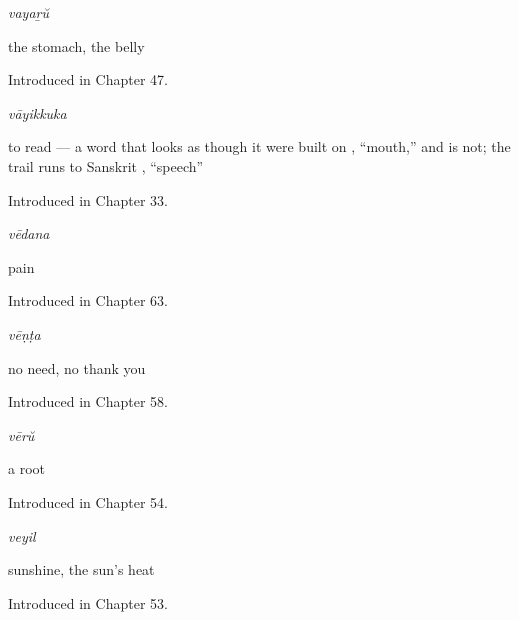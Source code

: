 \noindent\begin{minipage}[t]{\linewidth}
\raggedright
\textbf{}\enspace\emph{vayaṟŭ}\par
\small the stomach, the belly\par
\footnotesize Introduced in Chapter 47.
\end{minipage}\par\medskip

\noindent\begin{minipage}[t]{\linewidth}
\raggedright
\textbf{}\enspace\emph{vāyikkuka}\par
\small to read — a word that looks as though it were built on , \textquotedblleft{}mouth,\textquotedblright{} and is not; the trail runs to Sanskrit , \textquotedblleft{}speech\textquotedblright{}\par
\footnotesize Introduced in Chapter 33.
\end{minipage}\par\medskip

\noindent\begin{minipage}[t]{\linewidth}
\raggedright
\textbf{}\enspace\emph{vēdana}\par
\small pain\par
\footnotesize Introduced in Chapter 63.
\end{minipage}\par\medskip

\noindent\begin{minipage}[t]{\linewidth}
\raggedright
\textbf{}\enspace\emph{vēṇṭa}\par
\small no need, no thank you\par
\footnotesize Introduced in Chapter 58.
\end{minipage}\par\medskip

\noindent\begin{minipage}[t]{\linewidth}
\raggedright
\textbf{}\enspace\emph{vērŭ}\par
\small a root\par
\footnotesize Introduced in Chapter 54.
\end{minipage}\par\medskip

\noindent\begin{minipage}[t]{\linewidth}
\raggedright
\textbf{}\enspace\emph{veyil}\par
\small sunshine, the sun's heat\par
\footnotesize Introduced in Chapter 53.
\end{minipage}\par\medskip

